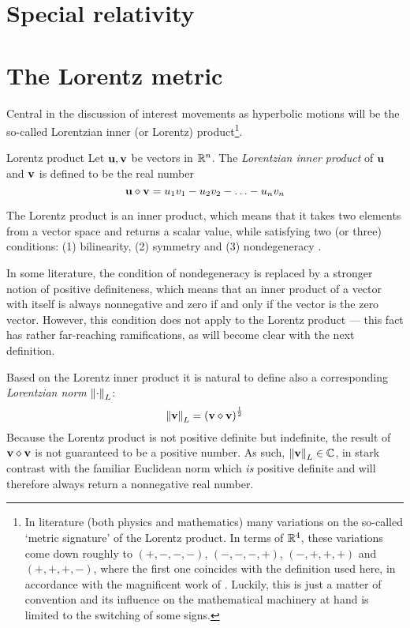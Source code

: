 \section{Special relativity}

\section{The Lorentz metric}
Central in the discussion of interest movements as hyperbolic motions will be the so-called Lorentzian inner (or Lorentz) product\footnote{In literature (both physics and mathematics) many variations on the so-called `metric signature' of the Lorentz product. In terms of $\mathbb{R}^4$, these variations come down roughly to $(+,-,-,-)$, $(-,-,-,+)$, $(-,+,+,+)$ and $(+,+,+,-)$, where the first one coincides with the definition used here, in accordance with the magnificent work of \citet{Landau1971}. Luckily, this is just a matter of convention and its influence on the mathematical machinery at hand is limited to the switching of some signs.}.
\begin{block}{Lorentz product}
    Let $\vb{u}, \vb{v}$ be vectors in $\mathbb{R}^n$. The \emph{Lorentzian inner product} of $\vb{u}$ and $\vb{v}$ is defined to be the real number
    $$ \vb{u} \diamond \vb{v} = u_1v_1 - u_2v_2 - \ldots - u_nv_n   $$
\end{block}
The Lorentz product is an inner product, which means that it takes two elements from a vector space and returns a scalar value, while satisfying two (or three) conditions: (1) bilinearity, (2) symmetry and (3) nondegeneracy \cite{Ratcliffe2019}.

In some literature, the condition of nondegeneracy is replaced by a stronger notion of positive definiteness, which means that an inner product of a vector with itself is always nonnegative and zero if and only if the vector is the zero vector. However, this condition does not apply to the Lorentz product --- this fact has rather far-reaching ramifications, as will become clear with the next definition. 

Based on the Lorentz inner product it is natural to define also a corresponding \emph{Lorentzian norm} $\norm{\cdot}_L$:
    $$ \norm{\vb{v}}_L = \qty(\vb{v}\diamond\vb{v})^\frac{1}{2} $$
Because the Lorentz product is not positive definite but indefinite, the result of $\vb{v}\diamond\vb{v}$ is not guaranteed to be a positive number. As such, $\norm{\vb{v}}_L \in \mathbb{C}$, in stark contrast with the familiar Euclidean norm which \emph{is} positive definite and will therefore always return a nonnegative real number.


